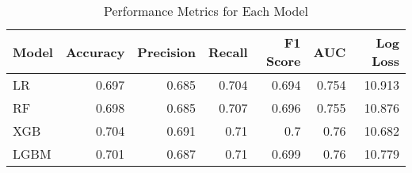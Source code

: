 \begin{table}[H]\centering
\caption{Performance Metrics for Each Model}
\label{Table 3 :performance_metrics}
\begin{tabular}{lrrrrrr}
\toprule
Model & Accuracy & Precision & Recall & F1 Score & AUC & Log Loss \\
\midrule
LR & 0.697 & 0.685 & 0.704 & 0.694 & 0.754 & 10.913 \\
RF & 0.698 & 0.685 & 0.707 & 0.696 & 0.755 & 10.876 \\
XGB & 0.704 & 0.691 & 0.71 & 0.7 & 0.76 & 10.682 \\
LGBM & 0.701 & 0.687 & 0.71 & 0.699 & 0.76 & 10.779 \\
\bottomrule
\end{tabular}
\end{table}
